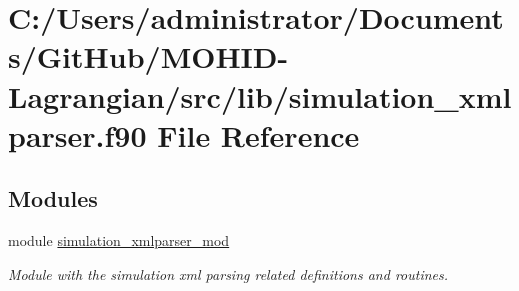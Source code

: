 \hypertarget{simulation__xmlparser_8f90}{}\section{C\+:/\+Users/administrator/\+Documents/\+Git\+Hub/\+M\+O\+H\+I\+D-\/\+Lagrangian/src/lib/simulation\+\_\+xmlparser.f90 File Reference}
\label{simulation__xmlparser_8f90}
\subsection*{Modules}
\begin{DoxyCompactItemize}
\item 
module \mbox{\hyperlink{namespacesimulation__xmlparser__mod}{simulation\+\_\+xmlparser\+\_\+mod}}
\begin{DoxyCompactList}\small\item\em Module with the simulation xml parsing related definitions and routines. \end{DoxyCompactList}\end{DoxyCompactItemize}
